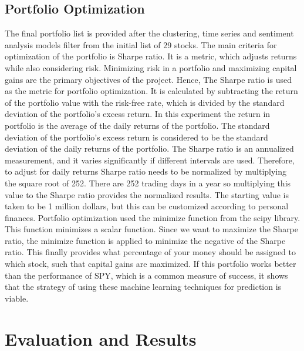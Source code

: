 \documentclass[12pt,a4paper, twoside]{article}
\begin{document}
\begin{multicols}{2}
\subsection{Portfolio Optimization}
The final portfolio list is provided after the clustering, time series and sentiment analysis models filter from the initial list of 29 stocks. The main criteria for optimization of the portfolio is Sharpe ratio. It is a metric, which adjusts returns while also considering risk. Minimizing risk in a portfolio and maximizing capital gains are the primary objectives of the project. Hence, The Sharpe ratio is used as the metric for portfolio optimization. It is calculated by subtracting the return of the portfolio value with the risk-free rate, which is divided by the standard deviation of the portfolio’s excess return. In this experiment the return in portfolio is the average of the daily returns of the portfolio. The standard deviation of the portfolio’s excess return is considered to be the standard deviation of the daily returns of the portfolio.
\newline
\indent
The Sharpe ratio is an annualized measurement, and it varies significantly if different intervals are used. Therefore, to adjust for daily returns Sharpe ratio needs to be normalized by multiplying the square root of 252. There are 252 trading days in a year so multiplying this value to the Sharpe ratio provides the normalized results. The starting value is taken to be 1 million dollars, but this can be customized according to personal finances.
\newline
\indent
Portfolio optimization used the minimize function from the scipy library. This function minimizes a scalar function. Since we want to maximize the Sharpe ratio, the minimize function is applied to minimize the negative of the Sharpe ratio. This finally provides what percentage of your money should be assigned to which stock, such that capital gains are maximized. If this portfolio works better than the performance of SPY, which is a common measure of success, it shows that the strategy of using these machine learning techniques for prediction is viable.

\section{Evaluation and Results}

\end{multicols}
\end{document}
